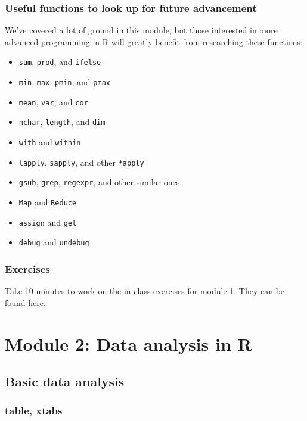 \documentclass{beamer}
\begin{document}
\begin{frame}
    \frametitle{Useful functions to look up for future advancement}
    We've covered a lot of ground in this module,
    but those interested in more advanced programming in R
    will greatly benefit from researching these functions:\\
    
    \begin{itemize}
      \item \texttt{sum}, \texttt{prod}, and \texttt{ifelse}
      \item \texttt{min}, \texttt{max}, \texttt{pmin}, and \texttt{pmax}
      \item \texttt{mean}, \texttt{var}, and \texttt{cor}
      \item \texttt{nchar}, \texttt{length}, and \texttt{dim}
      \item \texttt{with} and \texttt{within}
      \item \texttt{lapply}, \texttt{sapply}, and other \texttt{*apply}
      \item \texttt{gsub}, \texttt{grep}, \texttt{regexpr}, and other similar ones 
      \item \texttt{Map} and \texttt{Reduce}
      \item \texttt{assign} and \texttt{get}
      \item \texttt{debug} and \texttt{undebug}
    \end{itemize}
\end{frame}


\begin{frame}
    \frametitle{Exercises}
    Take 10 minutes to work on the in-class exercises for module 1.
    They can be found \href{https://github.com/rnitulescu/RcourseOncology2020/blob/master/exercises1.R}{here}.
\end{frame}



\section{Module 2: Data analysis in R}

\subsection{Basic data analysis}

\begin{frame}[fragile]
    \frametitle{table, xtabs}
    
\end{frame}
\end{document}
